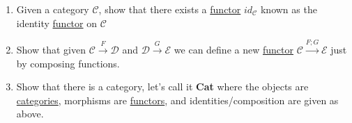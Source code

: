 \begin{enumerate}
    \item Given a category $\mathcal{C}$, show that there exists a \href{doc/1 math/Seven Sketches in Compositionality/Chapter 3: Databases/3 Functors, natural transformations, and databases/2 Functors/1 Functor}{functor} $id_\mathcal{C}$ known as the identity \href{doc/1 math/Seven Sketches in Compositionality/Chapter 3: Databases/3 Functors, natural transformations, and databases/2 Functors/1 Functor}{functor} on $\mathcal{C}$
    \item Show that given $\mathcal{C}\xrightarrow{F}\mathcal{D}$ and $\mathcal{D}\xrightarrow{G}\mathcal{E}$ we can define a new \href{doc/1 math/Seven Sketches in Compositionality/Chapter 3: Databases/3 Functors, natural transformations, and databases/2 Functors/1 Functor}{functor} $\mathcal{C}\xrightarrow{F;G}\mathcal{E}$ just by composing functions.
    \item Show that there is a category, let's call it \textbf{Cat} where the objects are \href{doc/1 math/Seven Sketches in Compositionality/Chapter 3: Databases/2 Categories/1 Free Categories/1 Category}{categories}, morphisms are \href{doc/1 math/Seven Sketches in Compositionality/Chapter 3: Databases/3 Functors, natural transformations, and databases/2 Functors/1 Functor}{functors}, and identities/composition are given as above.

  \end{enumerate}